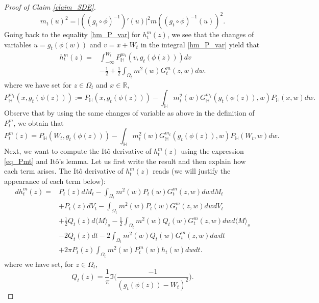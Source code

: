 \documentclass{article}
\newcommand{\HH}{{\mathbb{H}}}
\theoremstyle{definition}
\theoremstyle{remark}
\theoremstyle{remark}
\begin{document}
\begin{proof}[Proof of Claim \ref{claim_SDE}]
\begin{equation} \label{def_mt}
    m_t(u)^2 = \vert ((g_t \circ \phi)^{-1})'(u) \vert^2 m((g_t \circ \phi)^{-1}(u))^2.
\end{equation}
Going back to the equality \eqref{hm_P_var} for $h_t^m(z)$, we see that the changes of variables $u = g_t(\phi(w))$ and $v=x+W_t$ in the integral \eqref{hm_P_var} yield that
\begin{align} \label{eq_Pmt}
    h_t^m(z) = &\int_{-\infty}^{W_t} P_{\HH}^{m_t}(v, g_t(\phi(z))) dv \\
    & -\frac{1}{2} + \frac{1}{2} \int_{\Omega_t} m^2(w) G_t^m(z,w) dw.
\end{align}
where we have set for $z \in \Omega_t$ and $x \in \mathbb{R}$,
\begin{equation} \label{def_Pm_upper}
    P_{\HH}^{m_t}(x, g_t(\phi(z))) := P_{\HH}(x, g_t(\phi(z))) - \int_{\HH} m_t^2(w) G_{\HH}^{m_t}(g_t(\phi(z)),w) P_{\HH}(x,w) dw.
\end{equation}
Observe that by using the same changes of variable as above in the definition of $P_t^m$, we obtain that
\begin{equation*}
    P_t^m(z) = P_{\HH}(W_t,g_t(\phi(z))) - \int_{\HH} m_t^2(w) G_{\HH}^{m_t}(g_t(\phi(z)),w) P_{\HH}(W_t, w) dw.
\end{equation*}
Next, we want to compute the It\^o derivative of $h_t^m(z)$ using the expression \eqref{eq_Pmt} and It\^o's lemma. Let us first write the result and then explain how each term arises. The It\^o derivative of $h_t^m(z)$ reads (we will justify the appearance of each term below):
\begin{align}
    dh_t^m(z) = &P_t(z) dM_t - \int_{\Omega_t}m^2(w)P_t(w)G_t^m(z,w) dw dM_t \label{term_Mt}\\
    &+ P_t(z) dV_t - \int_{\Omega_t}m^2(w)P_t(w)G_t^m(z,w) dw dV_t \label{term_Vt} \\
    &+ \frac{1}{2}Q_t(z) d\langle M \rangle_s -  \frac{1}{2} \int_{\Omega_t}m^2(w)Q_t(w)G_t^m(z,w) dw d\langle M \rangle_s \label{term_bracket} \\
    & - 2Q_t(z) dt -2 \int_{\Omega_t}m^2(w)Q_t(w)G_t^m(z,w) dw dt \label{term_gt} \\
    &+ 2\pi P_t(z) \int_{\Omega_t}m^2(w)P_t^m(w)h_t(w)dwdt. \label{term_extra}
\end{align}
where we have set, for $z \in \Omega_t$,
\begin{equation*}
    Q_t(z) = \frac{1}{\pi} \Im \bigg( \frac{-1}{(g_t(\phi(z))-W_t)^2} \bigg).
\end{equation*}

\end{proof}
\end{document}
